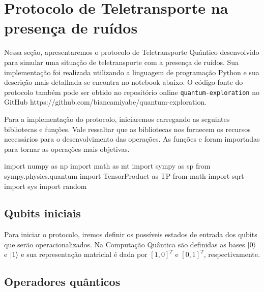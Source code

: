 
\chapter{Protocolo de Teletransporte na presença de ruídos}\label{app:protocolo}

Nessa seção, apresentaremos o protocolo de Teletransporte Quântico desenvolvido para simular uma situação de teletransporte com a presença de ruídos. Sua implementação foi realizada utilizando a linguagem de programação Python e sua descrição mais detalhada se encontra no notebook abaixo. O código-fonte do protocolo também pode ser obtido no repositório online \texttt{quantum-exploration} no GitHub \hypertarget{repositório}{https://github.com/biancamiyabe/quantum-exploration}.


Para a implementação do protocolo, iniciaremos carregando as seguintes bibliotecas e funções. Vale ressaltar que as bibliotecas nos fornecem os recursos necessários para o desenvolvimento das operações. As funções  e  foram importadas para tornar as operações mais objetivas.

\begin{pycode}
    import numpy as np
    import math as mt
    import sympy as sp
    from sympy.physics.quantum import TensorProduct as TP
    from math import sqrt
    import sys
    import random
\end{pycode}

\section{Qubits iniciais}\label{qubits-iniciais}

Para iniciar o protocolo, iremos definir os possíveis estados de entrada dos qubits que serão operacionalizados. Na Computação Quântica são definidas as bases \(\ket{0}\) e \(\ket{1}\) e sua representação matricial é dada por \([1, 0]^{T}\) e \([0, 1]^{T}\), respectivamente.

\section{Operadores quânticos}\label{operadores-quuxe2nticos}

